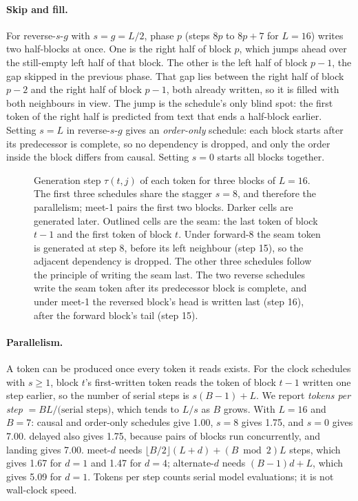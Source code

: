 \documentclass[11pt]{article}
\theoremstyle{definition}
\theoremstyle{remark}
\newcommand{\sch}[1]{\textsf{#1}}
\begin{document}
\paragraph{Skip and fill.}
For \sch{reverse-$s$-$g$} with $s=g=L/2$, phase $p$ (steps $8p$ to $8p+7$ for $L=16$) writes two half-blocks at once.
One is the right half of block $p$, which jumps ahead over the still-empty left half of that block.
The other is the left half of block $p-1$, the gap skipped in the previous phase.
That gap lies between the right half of block $p-2$ and the right half of block $p-1$, both already written, so it is filled with both neighbours in view.
The jump is the schedule's only blind spot: the first token of the right half is predicted from text that ends a half-block earlier.
Setting $s=L$ in \sch{reverse-$s$-$g$} gives an \emph{order-only} schedule: each block starts after its predecessor is complete, so no dependency is dropped, and only the order inside the block differs from \sch{causal}.
Setting $s=0$ starts all blocks together.

\begin{figure}[t]
  \centering
  \resizebox{\textwidth}{!}{}
  \caption{Generation step $\tau(t,j)$ of each token for three blocks of $L=16$. The first three schedules share the stagger $s=8$, and therefore the parallelism; \sch{meet-1} pairs the first two blocks. Darker cells are generated later. Outlined cells are the seam: the last token of block $t-1$ and the first token of block $t$.
  Under \sch{forward-8} the seam token is generated at step 8, before its left neighbour (step 15), so the adjacent dependency is dropped.
  The other three schedules follow the principle of writing the seam last. The two reverse schedules write the seam token after its predecessor block is complete, and under \sch{meet-1} the reversed block's head is written last (step 16), after the forward block's tail (step 15).}
  \label{fig:schedule}
\end{figure}

\paragraph{Parallelism.}
A token can be produced once every token it reads exists.
For the clock schedules with $s\ge1$, block $t$'s first-written token reads the token of block $t-1$ written one step earlier, so the number of serial steps is $s(B-1)+L$.
We report \emph{tokens per step} $=BL/\text{(serial steps)}$, which tends to $L/s$ as $B$ grows.
With $L=16$ and $B=7$: \sch{causal} and order-only schedules give 1.00, $s=8$ gives 1.75, and $s=0$ gives 7.00.
\sch{delayed} also gives 1.75, because pairs of blocks run concurrently, and \sch{landing} gives 7.00.
\sch{meet-$d$} needs $\lfloor B/2\rfloor(L+d)+(B\bmod 2)L$ steps, which gives 1.67 for $d=1$ and 1.47 for $d=4$; \sch{alternate-$d$} needs $(B-1)d+L$, which gives 5.09 for $d=1$.
Tokens per step counts serial model evaluations; it is not wall-clock speed.
\end{document}
